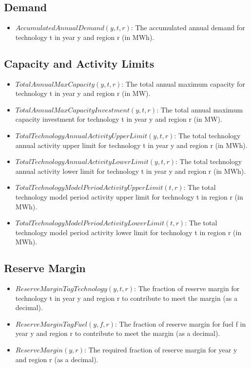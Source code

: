 \documentclass[11pt]{article}
\begin{document}
\subsection{Demand}
\begin{itemize}
    \item $AccumulatedAnnualDemand(y,t,r)$: The accumulated annual demand for technology t in year y and region r (in MWh).
\end{itemize}

\subsection{Capacity and Activity Limits}
\begin{itemize}
    \item $TotalAnnualMaxCapacity(y,t,r)$: The total annual maximum capacity for technology t in year y and region r (in MW).
    \item $TotalAnnualMaxCapacityInvestment(y,t,r)$: The total annual maximum capacity investment for technology t in year y and region r (in MW).
    \item $TotalTechnologyAnnualActivityUpperLimit(y,t,r)$: The total technology annual activity upper limit for technology t in year y and region r (in MWh).
    \item $TotalTechnologyAnnualActivityLowerLimit(y,t,r)$: The total technology annual activity lower limit for technology t in year y and region r (in MWh).
    \item $TotalTechnologyModelPeriodActivityUpperLimit(t,r)$: The total technology model period activity upper limit for technology t in region r (in MWh).
    \item $TotalTechnologyModelPeriodActivityLowerLimit(t,r)$: The total technology model period activity lower limit for technology t in region r (in MWh).
\end{itemize}

\subsection{Reserve Margin}
\begin{itemize}
    \item $ReserveMarginTagTechnology(y,t,r)$: The fraction of reserve margin for technology t in year y and region r to contribute to meet the margin (as a decimal).
    \item $ReserveMarginTagFuel(y,f,r)$: The fraction of reserve margin for fuel f in year y and region r to contribute to meet the margin (as a decimal).
    \item $ReserveMargin(y,r)$: The required fraction of reserve margin for year y and region r (as a decimal).
\end{itemize}
\end{document}
